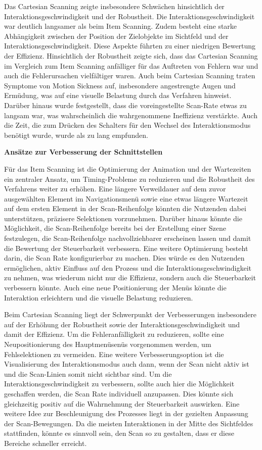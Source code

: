Das Cartesian Scanning zeigte insbesondere Schwächen hinsichtlich der Interaktionsgeschwindigkeit und der Robustheit. Die Interaktionsgeschwindigkeit war deutlich langsamer als beim Item Scanning. Zudem besteht eine starke Abhängigkeit zwischen der Position der Zielobjekte im Sichtfeld und der Interaktionsgeschwindigkeit. Diese Aspekte führten zu einer niedrigen Bewertung der Effizienz. Hinsichtlich der Robustheit zeigte sich, dass das Cartesian Scanning im Vergleich zum Item Scanning anfälliger für das Auftreten von Fehlern war und auch die Fehlerursachen vielfältiger waren. 
Auch beim Cartesian Scanning traten Symptome von Motion Sickness auf, insbesondere angestrengte Augen und Ermüdung, was auf eine visuelle Belastung durch das Verfahren hinweist.
Darüber hinaus wurde festgestellt, dass die voreingestellte Scan-Rate etwas zu langsam war, was wahrscheinlich die wahrgenommene Ineffizienz verstärkte. Auch die Zeit, die zum Drücken des Schalters für den Wechsel des Interaktionsmodus benötigt wurde, wurde als zu lang empfunden.

\textbf{Ansätze zur Verbesserung der Schnittstellen}

Für das Item Scanning ist die Optimierung der Animation und der Wartezeiten ein zentraler Ansatz, um Timing-Probleme zu reduzieren und die Robustheit des Verfahrens weiter zu erhöhen. Eine längere Verweildauer auf dem zuvor ausgewählten Element im Navigationsmenü sowie eine etwas längere Wartezeit auf dem ersten Element in der Scan-Reihenfolge könnten die Nutzenden dabei unterstützen, präzisere Selektionen vorzunehmen. Darüber hinaus könnte die Möglichkeit, die Scan-Reihenfolge bereits bei der Erstellung einer Szene festzulegen, die Scan-Reihenfolge nachvollziehbarer erscheinen lassen und damit die Bewertung der Steuerbarkeit verbessern.
Eine weitere Optimierung besteht darin, die Scan Rate konfigurierbar zu machen. Dies würde es den Nutzenden ermöglichen, aktiv Einfluss auf den Prozess und die Interaktionsgeschwindigkeit zu nehmen, was wiederum nicht nur die Effizienz, sondern auch die Steuerbarkeit verbessern könnte. Auch eine neue Positionierung der Menüs könnte die Interaktion erleichtern und die visuelle Belastung reduzieren.

Beim Cartesian Scanning liegt der Schwerpunkt der Verbesserungen insbesondere auf der Erhöhung der Robustheit sowie der Interaktionsgeschwindigkeit und damit der Effizienz. Um die Fehleranfälligkeit zu reduzieren, sollte eine Neupositionierung des Hauptmenüsenüs vorgenommen werden, um Fehlselektionen zu vermeiden. Eine weitere Verbesserungsoption ist die Visualisierung des Interaktionsmodus auch dann, wenn der Scan nicht aktiv ist und die Scan-Linien somit nicht sichtbar sind. 
Um die Interaktionsgeschwindigkeit zu verbessern, sollte auch hier die Möglichkeit geschaffen werden, die Scan Rate individuell anzupassen. Dies könnte sich gleichzeitig positiv auf die Wahrnehmung der Steuerbarkeit auswirken. Eine weitere Idee zur Beschleunigung des Prozesses liegt in der gezielten Anpassung der Scan-Bewegungen. Da die meisten Interaktionen in der Mitte des Sichtfeldes stattfinden, könnte es sinnvoll sein, den Scan so zu gestalten, dass er diese Bereiche schneller erreicht. 

